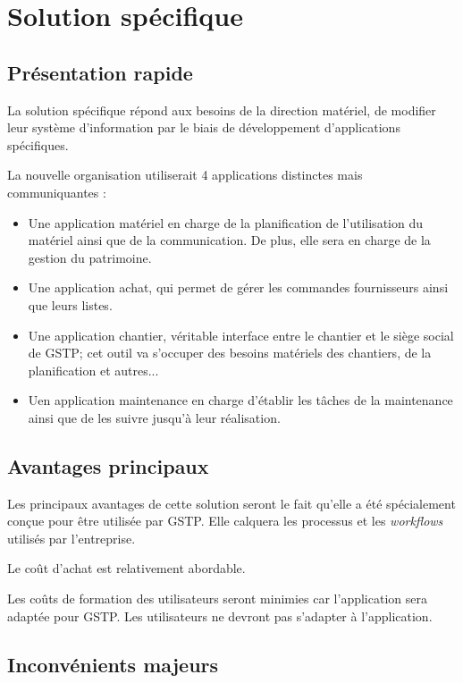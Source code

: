 \section{Solution spécifique}

\subsection{Présentation rapide}

La solution spécifique répond aux besoins de la direction matériel, de modifier
leur système d'information par le biais de développement d'applications spécifiques.

La nouvelle organisation utiliserait 4 applications distinctes mais communiquantes : 
\begin{itemize}
\item Une application matériel en charge de la planification de l'utilisation du 
matériel ainsi que de la communication. De plus, elle sera en charge de la gestion du 
patrimoine.
\item Une application achat, qui permet de gérer les commandes fournisseurs ainsi que
leurs listes.
\item Une application chantier, véritable interface entre le chantier et le siège 
social de GSTP; cet outil va s'occuper des besoins matériels des chantiers, de la planification et autres...
\item Uen application maintenance en charge d'établir les tâches de la maintenance ainsi que de les suivre 
jusqu'à leur réalisation.
\end{itemize}

\subsection{Avantages principaux}

Les principaux avantages de cette solution seront le fait qu'elle a été spécialement
conçue pour être utilisée par GSTP. Elle calquera les processus et les {\sl workflows}
utilisés par l'entreprise.

Le coût d'achat est relativement abordable.

Les coûts de formation des utilisateurs seront minimies car l'application sera 
adaptée pour GSTP. Les utilisateurs ne devront pas s'adapter à l'application.

\subsection{Inconvénients majeurs}

